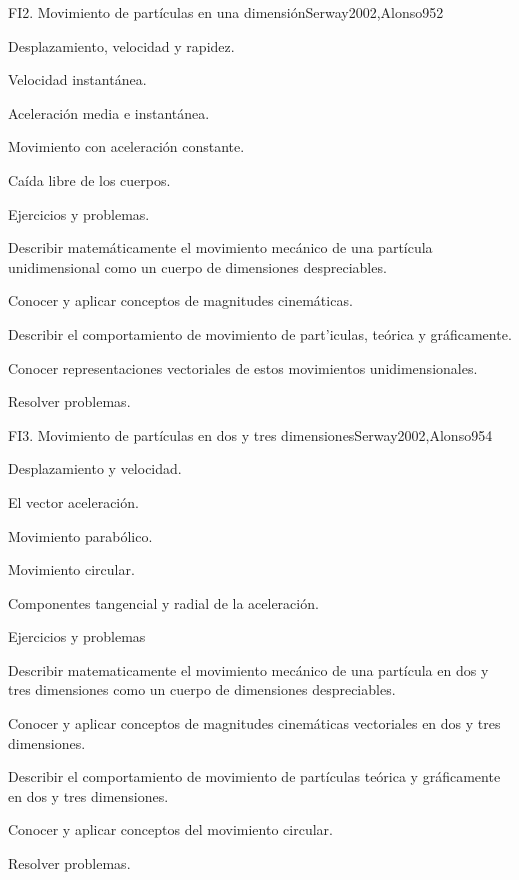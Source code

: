 \begin{sumilla}
\begin{unit}{FI2. Movimiento de part\'iculas en una dimensi\'on}{Serway2002,Alonso95}{2}
\begin{topicos}
      \item Desplazamiento, velocidad y rapidez.
      \item Velocidad instant\'anea.
      \item Aceleraci\'on media e instant\'anea.
      \item Movimiento con aceleraci\'on constante.
      \item Ca\'ida libre de los cuerpos.
      \item Ejercicios y problemas.
    \end{topicos}
   \begin{objetivos}
      \item Describir matem\'aticamente el movimiento mec\'anico de una part\'icula unidimensional como un cuerpo de dimensiones despreciables.
      \item Conocer y aplicar conceptos de magnitudes cinem\'aticas.
      \item Describir el comportamiento de movimiento de part'iculas, te\'orica y gr\'aficamente.
      \item Conocer representaciones vectoriales de estos movimientos unidimensionales.
      \item Resolver problemas.
   \end{objetivos}
\end{unit}

\begin{unit}{FI3. Movimiento de part\'iculas en dos y tres dimensiones}{Serway2002,Alonso95}{4}
\begin{topicos}
      \item Desplazamiento y velocidad.
      \item El vector aceleraci\'on.
      \item Movimiento parab\'olico.
      \item Movimiento circular.
      \item Componentes tangencial y radial de la aceleraci\'on.
      \item Ejercicios y problemas
\end{topicos}

   \begin{objetivos}
      \item Describir matematicamente el movimiento mec\'anico de una part\'icula en dos y tres dimensiones como un cuerpo de dimensiones despreciables.
      \item Conocer y aplicar conceptos de magnitudes cinem\'aticas vectoriales en dos y tres dimensiones.
      \item Describir el comportamiento de movimiento de part\'iculas te\'orica y gr\'aficamente en dos y tres dimensiones.
      \item Conocer y aplicar conceptos del movimiento circular.
      \item Resolver problemas.
   \end{objetivos}
\end{unit}


\end{sumilla}
